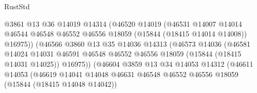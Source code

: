 \begin{lexlean}{RustStd}
\begin{coremodule}
                                      @3861
                                      @13
                                      @36
                                      @14019
                                      @14314
                                      (@46520
                                        @14019
                                        (@46531
                                          @14007
                                          @14014
                                          @46544
                                          @46548
                                          @46552
                                          @46556
                                          @18059
                                          (@15844 (@18415 @14014 @14008))
                                          @16975))
                                      (@46566
                                        @3860
                                        @13
                                        @35
                                        @14036
                                        @14313
                                        (@46573
                                          @14036
                                          (@46581
                                            @14024
                                            @14031
                                            @46591
                                            @46548
                                            @46552
                                            @46556
                                            @18059
                                            (@15844 (@18415 @14031 @14025))
                                            @16975))
                                        (@46604
                                          @3859
                                          @13
                                          @34
                                          @14053
                                          @14312
                                          (@46611
                                            @14053
                                            (@46619
                                              @14041
                                              @14048
                                              @46631
                                              @46548
                                              @46552
                                              @46556
                                              @18059
                                              (@15844 (@18415 @14048 @14042))

\end{coremodule}
\end{lexlean}
